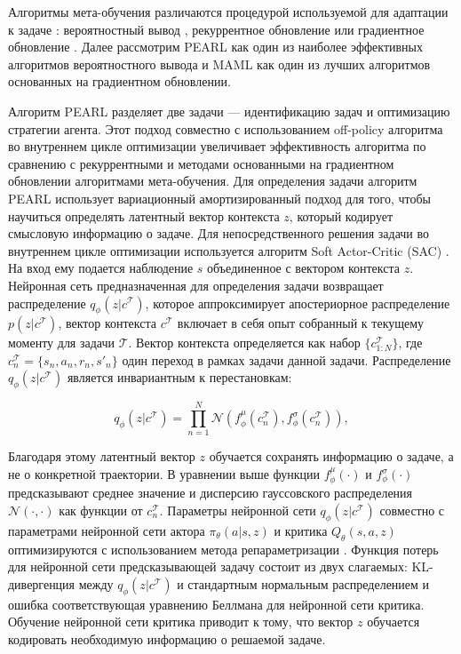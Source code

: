 Алгоритмы мета-обучения различаются процедурой используемой для адаптации к задаче \cite{meld}: вероятностный вывод  \cite{PEARL, VariBad},  рекуррентное обновление \cite{meld, RL2} или градиентное обновление \cite{maml}.  Далее рассмотрим PEARL  \cite{PEARL} как один из наиболее эффективных алгоритмов вероятностного вывода и MAML \cite{maml} как один из лучших алгоритмов основанных на градиентном обновлении. 

Алгоритм PEARL разделяет две задачи --- идентификацию задач и оптимизацию стратегии агента. Этот подход совместно с использованием off-policy алгоритма во внутреннем цикле оптимизации увеличивает эффективность алгоритма по сравнению с рекуррентными и методами основанными на градиентном обновлении алгоритмами мета-обучения. Для определения задачи алгоритм PEARL использует вариационный амортизированный подход \cite{vae, vae2014, vae2016} для того, чтобы научиться определять латентный вектор контекста  $z$, который кодирует смысловую информацию о задаче. Для непосредственного решения задачи во внутреннем цикле оптимизации используется алгоритм Soft Actor-Critic (SAC) \cite{sac, sac_applications}. На вход ему подается наблюдение $s$ объединенное с вектором контекста $z$. 
Нейронная сеть предназначенная для определения задачи возвращает распределение $q_{\phi}(z|c^{\mathcal{T}})$, которое аппроксимирует апостериорное распределение $p(z|c^{\mathcal{T}})$, вектор контекста $c^{\mathcal{T}}$ включает в себя опыт собранный к текущему моменту для задачи $\mathcal{T}$. Вектор контекста определяется как набор $\{c^{\mathcal{T}}_{1:N}\}$, где $c^{\mathcal{T}}_{n} = \{s_{n}, a_{n}, r_{n}, s'_{n}\}$ один переход в рамках задачи данной задачи. Распределение $q_{\phi}(z|c^{\mathcal{T}})$ является инвариантным к перестановкам:

\begin{equation}\label{eq:qzc}
    q_{\phi}(z|c^{\mathcal{T}}) = \prod_{n=1}^{N} \mathcal{N}(f^{\mu}_{\phi}(c_{n}^{\mathcal{T}}), f^{\sigma}_{\phi}(c_{n}^{\mathcal{T}})),
\end{equation}

Благодаря этому латентный вектор $z$ обучается сохранять информацию о задаче, а не о конкретной траектории. 
В уравнении выше функции $f^{\mu}_{\phi}(\cdot)$ и $f^{\sigma}_{\phi}(\cdot)$ предсказывают среднее значение и дисперсию гауссовского распределения $\mathcal{N}(\cdot,\cdot)$ как функции от $c_{n}^{\mathcal{T}}$. Параметры нейронной сети $q_{\phi}(z|c^{\mathcal{T}})$ совместно с параметрами нейронной сети актора $\pi_{\theta}(a|s, z)$ и критика $Q_{\theta}(s, a, z)$ оптимизируются с использованием метода  репараметризации \cite{vae}. 
Функция потерь для нейронной сети предсказывающей задачу состоит из двух слагаемых: KL-дивергенция между $q_{\phi}(z|c^{\mathcal{T}})$ и стандартным нормальным распределением  и ошибка соответствующая уравнению Беллмана для нейронной сети критика. Обучение нейронной сети критика приводит к тому, что вектор $z$ обучается кодировать необходимую информацию о решаемой задаче. 

